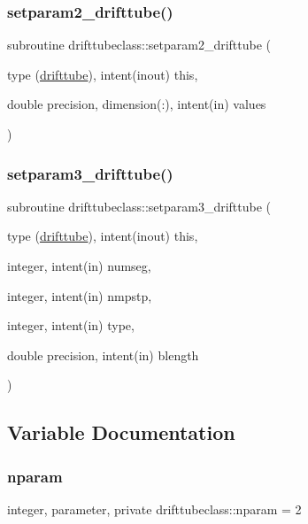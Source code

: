 \subsubsection{\texorpdfstring{setparam2\_drifttube()}{setparam2\_drifttube()}}
{\footnotesize\ttfamily subroutine drifttubeclass\+::setparam2\+\_\+drifttube (\begin{DoxyParamCaption}\item[{type (\mbox{\hyperlink{namespacedrifttubeclass_structdrifttubeclass_1_1drifttube}{drifttube}}), intent(inout)}]{this,  }\item[{double precision, dimension(\+:), intent(in)}]{values }\end{DoxyParamCaption})}

\mbox{\label{namespacedrifttubeclass_a5c05a55ca0f98570b2b02f3c84181015}} 
\subsubsection{\texorpdfstring{setparam3\_drifttube()}{setparam3\_drifttube()}}
{\footnotesize\ttfamily subroutine drifttubeclass\+::setparam3\+\_\+drifttube (\begin{DoxyParamCaption}\item[{type (\mbox{\hyperlink{namespacedrifttubeclass_structdrifttubeclass_1_1drifttube}{drifttube}}), intent(inout)}]{this,  }\item[{integer, intent(in)}]{numseg,  }\item[{integer, intent(in)}]{nmpstp,  }\item[{integer, intent(in)}]{type,  }\item[{double precision, intent(in)}]{blength }\end{DoxyParamCaption})}



\subsection{Variable Documentation}
\mbox{\label{namespacedrifttubeclass_af382d7cef81496c1d2c2bf3ba72c4350}} 
\subsubsection{\texorpdfstring{nparam}{nparam}}
{\footnotesize\ttfamily integer, parameter, private drifttubeclass\+::nparam = 2\hspace{0.3cm}{\ttfamily [private]}}

